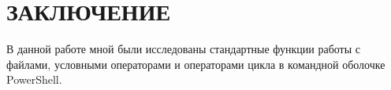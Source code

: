 \section*{ЗАКЛЮЧЕНИЕ}

В данной работе мной были исследованы стандартные функции работы с файлами,
условными операторами и операторами цикла в командной оболочке PowerShell.

\newpage
